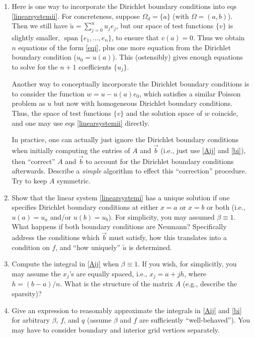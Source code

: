 \documentclass{article}
\begin{document}
\begin{enumerate}

\item Here is one way to incorporate the Dirichlet boundary conditions into eqs \eqref{linearsystemii}.  For concreteness, suppose \(\Omega_d = \{a\}\) (with \(\Omega = (a,b)\)).  Then we still have \(\tilde{u} = \sum_{j = 0}^n u_j e_j\), but our space of test functions \(\{v\}\) is slightly smaller, \(\operatorname{span} \{ e_1, \dotsc, e_n \}\), to ensure that \(v(a) = 0\).  Thus we obtain \(n\) equations of the form \eqref{eqi}, plus one more equation from the Dirichlet boundary condition (\(u_0 = u(a)\)).  This (ostensibly) gives enough equations to solve for the \(n + 1\) coefficients \(\{u_j\}\).

Another way to conceptually incorporate the Dirichlet boundary conditions is to consider the function \(w = u - u(a) e_0\), which satisfies a similar Poisson problem as \(u\) but now with homogeneous Dirichlet boundary conditions.  Thus, the space of test functions \(\{v\}\) and the solution space of \(w\) coincide, and one may use eqs \eqref{linearsystemii} directly.

In practice, one can actually just ignore the Dirichlet boundary conditions when initially computing the entries of \(A\) and \(\vec{b}\) (i.e., just use \eqref{Aij} and \eqref{bi}), then ``correct'' \(A\) and \(\vec{b}\) to account for the Dirichlet boundary conditions afterwards.  Describe a {\em simple} algorithm to effect this ``correction'' procedure.  Try to keep \(A\) symmetric.

\item Show that the linear system \eqref{linearsystemi} has a unique solution if one specifies Dirichlet boundary conditions at either \(x = a\) or \(x = b\) or both (i.e., \(u(a) = u_a\) and/or \(u(b) = u_b\)).  For simplicity, you may assumed \(\beta \equiv 1\).  What happens if both boundary conditions are Neumann?  Specifically address the conditions which \(\vec{b}\) must satisfy, how this translates into a condition on \(f\), and ``how uniquely'' \(\tilde{u}\) is determined.

\item Compute the integral in \eqref{Aij} when \(\beta \equiv 1\).  If you wish, for simplicitly, you may assume the \(x_j\)'s are equally spaced, i.e., \(x_j = a + j h\), where \(h = (b - a)/n\).  What is the structure of the matrix \(A\) (e.g., describe the sparsity)?

\item Give an expression to reasonably approximate the integrals in \eqref{Aij} and \eqref{bi} for arbitrary \(\beta\), \(f\), and \(q\) (assume \(\beta\) and \(f\) are sufficiently ``well-behaved'').  You may have to consider boundary and interior grid vertices separately.


\end{enumerate}
\end{document}
